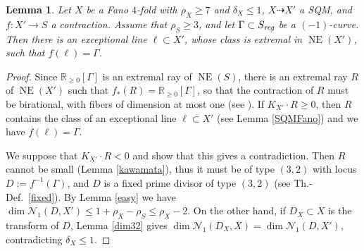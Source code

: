 \documentclass[a4paper,12pt]{amsart}
\newtheorem{lemma}[thm]{Lemma}
\theoremstyle{definition}
\numberwithin{figure}{section}
\numberwithin{table}{section}
\newcommand{\R}{\mathbb{R}}
\newcommand{\N}{\mathcal{N}_1}
\newcommand{\NE}{\operatorname{NE}}
\newcommand{\reg}{\text{\it reg}}
\begin{document}
  \begin{lemma}\label{lifting}
  Let $X$ be a Fano $4$-fold with $\rho_X\geq 7$ and $\delta_X\leq 1$, $X\dasharrow X'$ a SQM, and $f\colon X'\to S$ a  contraction.
Assume that  $\rho_S\geq 3$, and  
  let $\Gamma\subset S_{\reg}$ be a $(-1)$-curve. Then there is an exceptional line $\ell\subset X'$, whose class is extremal in $\NE(X')$, such that $f(\ell)=\Gamma$.
  \end{lemma}
\begin{proof}
  Since $\R_{\geq 0}[\Gamma]$ is an extremal ray of $\NE(S)$, there is an extremal ray $R$ of $\NE(X')$ such that $f_*(R)=\R_{\geq 0}[\Gamma]$, so that the contraction of $R$ must be birational, with fibers of dimension at most one (see \cite[\S 2.5]{fanos}).  If $K_{X'}\cdot R\geq 0$, then $R$ contains the class of  an exceptional line $\ell\subset X'$ (see Lemma \ref{SQMFano}) and we have $f(\ell)=\Gamma$.

 We suppose that $K_{X'}\cdot R< 0$ and show that this gives a contradiction.
 Then $R$ cannot be small (Lemma \ref{kawamata}), thus it must be of type $(3,2)$  with locus $D:=f^{-1}(\Gamma)$, and $D$ is a fixed prime divisor of type $(3,2)$ (see Th.-Def.~\ref{fixed}). By Lemma \ref{easy} we have $\dim\N(D,X')\leq 1+\rho_X-\rho_S\leq\rho_X-2$.
 On the other hand, if $D_X\subset X$ is the transform of $D$,  Lemma \ref{dim32} gives $\dim\N(D_X,X)=\dim\N(D,X')$,  contradicting $\delta_X\leq 1$.
\end{proof}
\end{document}
